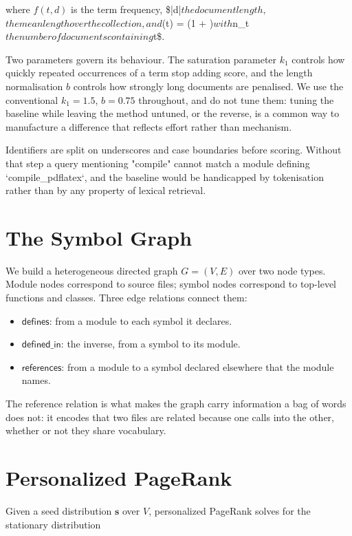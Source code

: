 \documentclass[10pt,twocolumn,letterpaper]{article}
\begin{document}
where $f(t, d)$ is the term frequency, \$|d|$ the document length, $$ the mean length over the collection, and $(t) = \log\left(1 + \right)$ with $n\_t$ the number of documents containing $t\$.

Two parameters govern its behaviour. The saturation parameter $k_1$ controls how quickly repeated occurrences of a term stop adding score, and the length normalisation $b$ controls how strongly long documents are penalised. We use the conventional $k_1 = 1.5$, $b = 0.75$ throughout, and do not tune them: tuning the baseline while leaving the method untuned, or the reverse, is a common way to manufacture a difference that reflects effort rather than mechanism.

Identifiers are split on underscores and case boundaries before scoring. Without that step a query mentioning "compile" cannot match a module defining `compile\_pdflatex`, and the baseline would be handicapped by tokenisation rather than by any property of lexical retrieval.


\section{The Symbol Graph}


We build a heterogeneous directed graph $G = (V, E)$ over two node types. Module nodes correspond to source files; symbol nodes correspond to top-level functions and classes. Three edge relations connect them:

\begin{itemize}
  \item $\textsf{defines}$: from a module to each symbol it declares.
  \item $\textsf{defined\_in}$: the inverse, from a symbol to its module.
  \item $\textsf{references}$: from a module to a symbol declared elsewhere that the module names.
\end{itemize}

The reference relation is what makes the graph carry information a bag of words does not: it encodes that two files are related because one calls into the other, whether or not they share vocabulary.


\section{Personalized PageRank}


Given a seed distribution $\mathbf{s}$ over $V$, personalized PageRank solves for the stationary distribution
\end{document}
